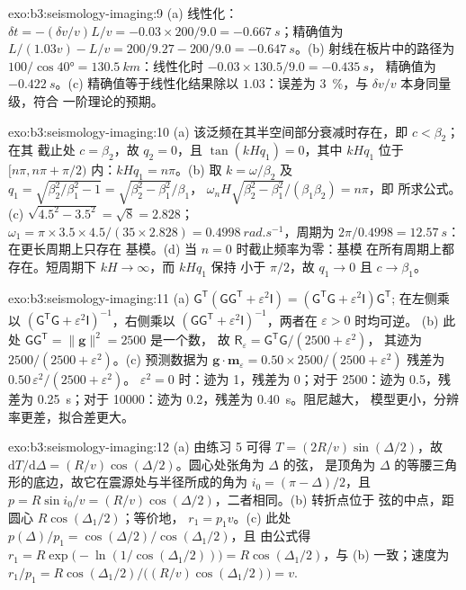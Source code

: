 \begin{solution}{exo:b3:seismology-imaging:9}
(a) 线性化：$\delta t = -(\delta v/v)L/v = -0.03\times200/9.0 =
\qty{-0.667}{s}$；精确值为 $L/(1.03v) - L/v = 200/9.27 - 200/9.0 =
\qty{-0.647}{s}$。(b) 射线在板片中的路径为 $100/\cos\ang{40} =
\qty{130.5}{km}$：线性化时 $-0.03\times130.5/9.0 = \qty{-0.435}{s}$，
精确值为 $\qty{-0.422}{s}$。(c) 精确值等于线性化结果除以
$1.03$：误差为 \qty{3}{\percent}，与 $\delta v/v$ 本身同量级，符合
一阶理论的预期。
\end{solution}

\begin{solution}{exo:b3:seismology-imaging:10}
(a) 该泛频在其半空间部分衰减时存在，即 $c < \beta_2$；在其
截止处 $c = \beta_2$，故 $q_2 = 0$，且 $\tan(kHq_1) = 0$，其中 $kHq_1$ 位于
$[n\pi, n\pi + \pi/2)$ 内：$kHq_1 = n\pi$。(b) 取 $k = \omega/\beta_2$ 及
$q_1 = \sqrt{\beta_2^2/\beta_1^2 - 1} = \sqrt{\beta_2^2 - \beta_1^2}/\beta_1$，
$\omega_nH\sqrt{\beta_2^2 - \beta_1^2}/(\beta_1\beta_2) = n\pi$，即
所求公式。(c) $\sqrt{4.5^2 - 3.5^2} = \sqrt8 = 2.828$；$\omega_1 =
\pi\times3.5\times4.5/(35\times2.828) = \qty{0.4998}{rad.s^{-1}}$，周期为
$2\pi/0.4998 = \qty{12.57}{s}$：在更长周期上只存在
基模。(d) 当 $n = 0$ 时截止频率为零：基模
在所有周期上都存在。短周期下 $kH \to \infty$，而 $kHq_1$ 保持
小于 $\pi/2$，故 $q_1 \to 0$ 且 $c \to \beta_1$。
\end{solution}

\begin{solution}{exo:b3:seismology-imaging:11}
(a) $\mathsf G^{\mathsf T}(\mathsf G\mathsf G^{\mathsf T} + \varepsilon^2\mathsf I)
= (\mathsf G^{\mathsf T}\mathsf G + \varepsilon^2\mathsf I)\mathsf G^{\mathsf T}$;
在左侧乘以 $(\mathsf G^{\mathsf T}\mathsf G + \varepsilon^2
\mathsf I)^{-1}$，右侧乘以 $(\mathsf G\mathsf G^{\mathsf T} +
\varepsilon^2\mathsf I)^{-1}$，两者在 $\varepsilon > 0$ 时均可逆。
(b) 此处 $\mathsf G\mathsf G^{\mathsf T} = \|\mathbf g\|^2 = 2500$ 是一个数，
故 $\mathsf R_\varepsilon = \mathsf G^{\mathsf T}\mathsf G/(2500 + \varepsilon^2)$，
其迹为 $2500/(2500 + \varepsilon^2)$。(c) 预测数据为
$\mathbf g\cdot\mathbf m_\varepsilon = 0.50\times2500/(2500 + \varepsilon^2)$
残差为 $0.50\,\varepsilon^2/(2500 + \varepsilon^2)$。
$\varepsilon^2 = 0$ 时：迹为 1，残差为 0；对于 2500：迹为 0.5，残差为
\qty{0.25}{s}；对于 \num{10000}：迹为 0.2，残差为 \qty{0.40}{s}。阻尼越大，
模型更小，分辨率更差，拟合差更大。
\end{solution}

\begin{solution}{exo:b3:seismology-imaging:12}
(a) 由练习 5 可得 $T = (2R/v)\sin(\Delta/2)$，故 $\mathrm dT/\mathrm d\Delta
= (R/v)\cos(\Delta/2)$。圆心处张角为 $\Delta$ 的弦，
是顶角为 $\Delta$ 的等腰三角形的底边，故它在震源处与半径所成的角为
$i_0 = (\pi - \Delta)/2$，且 $p = R\sin i_0/v =
(R/v)\cos(\Delta/2)$，二者相同。(b) 转折点位于
弦的中点，距圆心 $R\cos(\Delta_1/2)$；等价地，
$r_1 = p_1v$。(c) 此处 $p(\Delta)/p_1 = \cos(\Delta/2)/\cos(\Delta_1/2)$，且
由公式得 $r_1 = R\exp\bigl(-\ln(1/\cos(\Delta_1/2))\bigr) =
R\cos(\Delta_1/2)$，与 (b) 一致；速度为 $r_1/p_1 = R\cos(\Delta_1/2)\big/
\bigl((R/v)\cos(\Delta_1/2)\bigr) = v$.
\end{solution}


